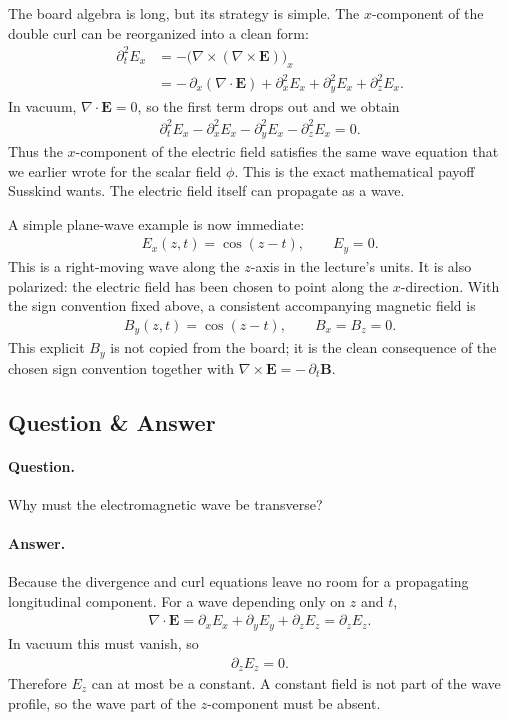 The board algebra is long, but its strategy is simple. The \(x\)-component of the double curl can be reorganized into a clean form:
\begin{align}
\partial_t^2 E_x
&= -\bigl(\nabla \times (\nabla \times \mathbf E)\bigr)_x\\
&= -\,\partial_x(\nabla \cdot \mathbf E)
   + \partial_x^2 E_x + \partial_y^2 E_x + \partial_z^2 E_x.
\end{align}
In vacuum, \(\nabla\cdot\mathbf E=0\), so the first term drops out and we obtain
\begin{align}
\partial_t^2 E_x - \partial_x^2 E_x - \partial_y^2 E_x - \partial_z^2 E_x = 0.
\end{align}
Thus the \(x\)-component of the electric field satisfies the same wave equation that we earlier wrote for the scalar field \(\phi\). This is the exact mathematical payoff Susskind wants. The electric field itself can propagate as a wave.

A simple plane-wave example is now immediate:
\begin{align}
E_x(z,t) = \cos(z-t), \qquad E_y = 0.
\end{align}
This is a right-moving wave along the \(z\)-axis in the lecture's units. It is also polarized: the electric field has been chosen to point along the \(x\)-direction. With the sign convention fixed above, a consistent accompanying magnetic field is
\begin{align}
B_y(z,t) = \cos(z-t), \qquad B_x = B_z = 0.
\end{align}
This explicit \(B_y\) is not copied from the board; it is the clean consequence of the chosen sign convention together with \(\nabla\times\mathbf E=-\,\partial_t\mathbf B\).

\subsection{Question \& Answer}

\paragraph{Question.} Why must the electromagnetic wave be transverse?

\paragraph{Answer.} Because the divergence and curl equations leave no room for a propagating longitudinal component. For a wave depending only on \(z\) and \(t\),
\begin{align}
\nabla \cdot \mathbf E
= \partial_x E_x + \partial_y E_y + \partial_z E_z
= \partial_z E_z.
\end{align}
In vacuum this must vanish, so
\begin{align}
\partial_z E_z = 0.
\end{align}
Therefore \(E_z\) can at most be a constant. A constant field is not part of the wave profile, so the wave part of the \(z\)-component must be absent.

